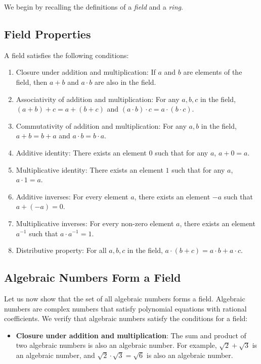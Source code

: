 \documentclass{article}
\newenvironment{proofbox}
  {\begin{mdframed}[linewidth=1pt,linecolor=black,backgroundcolor=white]\noindent\ignorespaces}
  {\end{mdframed}}
\begin{document}
\begin{proofbox}
    We begin by recalling the definitions of a \emph{field} and a \emph{ring}.

    \subsection*{Field Properties}
    A field satisfies the following conditions:
    \begin{enumerate}
        \item Closure under addition and multiplication: If \( a \) and \( b \) are elements of the field, then \( a + b \) and \( a \cdot b \) are also in the field.
        \item Associativity of addition and multiplication: For any \( a, b, c \) in the field, \( (a + b) + c = a + (b + c) \) and \( (a \cdot b) \cdot c = a \cdot (b \cdot c) \).
        \item Commutativity of addition and multiplication: For any \( a, b \) in the field, \( a + b = b + a \) and \( a \cdot b = b \cdot a \).
        \item Additive identity: There exists an element \( 0 \) such that for any \( a \), \( a + 0 = a \).
        \item Multiplicative identity: There exists an element \( 1 \) such that for any \( a \), \( a \cdot 1 = a \).
        \item Additive inverses: For every element \( a \), there exists an element \( -a \) such that \( a + (-a) = 0 \).
        \item Multiplicative inverses: For every non-zero element \( a \), there exists an element \( a^{-1} \) such that \( a \cdot a^{-1} = 1 \).
        \item Distributive property: For all \( a, b, c \) in the field, \( a \cdot (b + c) = a \cdot b + a \cdot c \).
    \end{enumerate}
    
    \subsection*{Algebraic Numbers Form a Field}
    Let us now show that the set of all algebraic numbers forms a field. Algebraic numbers are complex numbers that satisfy polynomial equations with rational coefficients. We verify that algebraic numbers satisfy the conditions for a field:
    
    \begin{itemize}
        \item \textbf{Closure under addition and multiplication}: The sum and product of two algebraic numbers is also an algebraic number. For example, \( \sqrt{2} + \sqrt{3} \) is an algebraic number, and \( \sqrt{2} \cdot \sqrt{3} = \sqrt{6} \) is also an algebraic number.
        

\end{itemize}
\end{proofbox}
\end{document}
